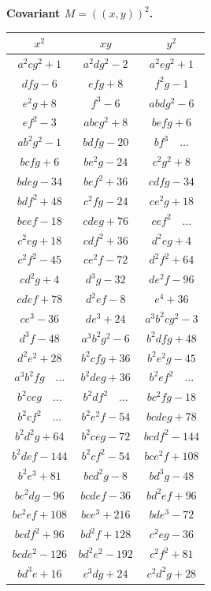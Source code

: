 \documentclass[11pt,a4paper]{book}
\begin{document}
\textbf{Covariant $M = (\!\!(x,y)\!\!)^{2}$.}
\begin{center}
\small
\begin{tabular}{|c|c|c|}
\hline
$x^{2}$ & $xy$ & $y^{2}$ \\
\hline
$a^{2}cg^{2}+1$ & $a^{2}dg^{2}-2$ & $a^{2}eg^{2}+1$ \\
$dfg-6$ & $efg+8$ & $f^{2}g-1$ \\
$e^{2}g+8$ & $f^{3}-6$ & $abdg^{2}-6$ \\
$ef^{2}-3$ & $abcg^{2}+8$ & $befg+6$ \\
$ab^{2}g^{2}-1$ & $bdfg-20$ & $bf^{3}\quad\dots$ \\
$bcfg+6$ & $be^{2}g-24$ & $c^{2}g^{2}+8$ \\
$bdeg-34$ & $bef^{2}+36$ & $cdfg-34$ \\
$bdf^{2}+48$ & $c^{2}fg-24$ & $ce^{2}g+18$ \\
$beef-18$ & $cdeg+76$ & $cef^{2}\quad\dots$ \\
$c^{2}eg+18$ & $cdf^{2}+36$ & $d^{2}eg+4$ \\
$c^{2}f^{2}-45$ & $ce^{2}f-72$ & $d^{2}f^{2}+64$ \\
$cd^{2}g+4$ & $d^{3}g-32$ & $de^{2}f-96$ \\
$cdef+78$ & $d^{2}ef-8$ & $e^{4}+36$ \\
$ce^{3}-36$ & $de^{3}+24$ & $a^{3}b^{2}cg^{2}-3$ \\
$d^{3}f-48$ & $a^{3}b^{2}g^{2}-6$ & $b^{2}dfg+48$ \\
$d^{2}e^{2}+28$ & $b^{2}cfg+36$ & $b^{2}e^{2}g-45$ \\
$a^{3}b^{2}fg\quad\dots$ & $b^{2}deg+36$ & $b^{2}ef^{2}\quad\dots$ \\
$b^{2}ceg\quad\dots$ & $b^{2}df^{2}\quad\dots$ & $bc^{2}fg-18$ \\
$b^{2}cf^{2}\quad\dots$ & $b^{2}e^{2}f-54$ & $bcdeg+78$ \\
$b^{2}d^{2}g+64$ & $b^{2}ceg-72$ & $bcdf^{2}-144$ \\
$b^{2}def-144$ & $b^{2}cf^{2}-54$ & $bce^{2}f+108$ \\
$b^{2}e^{3}+81$ & $bcd^{2}g-8$ & $bd^{3}g-48$ \\
$bc^{2}dg-96$ & $bcdef-36$ & $bd^{2}ef+96$ \\
$bc^{2}ef+108$ & $bce^{3}+216$ & $bde^{3}-72$ \\
$bcdf^{2}+96$ & $bd^{2}f+128$ & $c^{2}eg-36$ \\
$bcde^{2}-126$ & $bd^{2}e^{2}-192$ & $c^{2}f^{2}+81$ \\
$bd^{3}e+16$ & $c^{3}dg+24$ & $c^{2}d^{2}g+28$ \\

\end{tabular}
\end{center}
\end{document}
